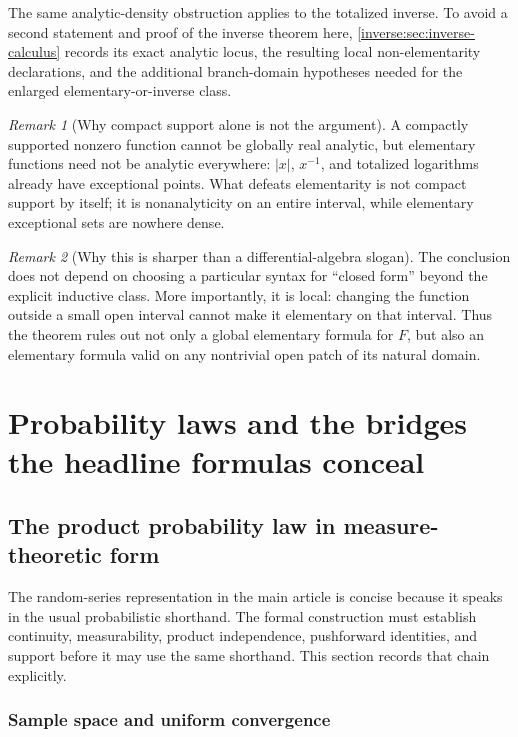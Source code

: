 \documentclass[11pt,oneside]{article}
\theoremstyle{definition}
\theoremstyle{remark}
\newtheorem{remark}[remark]{Remark}
\begin{document}
The same analytic-density obstruction applies to the totalized inverse.  To avoid a second
statement and proof of the inverse theorem here, \cref{inverse:sec:inverse-calculus} records
its exact analytic locus, the resulting local non-elementarity declarations, and the
additional branch-domain hypotheses needed for the enlarged elementary-or-inverse class.

\begin{remark}[Why compact support alone is not the argument]
A compactly supported nonzero function cannot be globally real analytic, but elementary
functions need not be analytic everywhere: $|x|$, $x^{-1}$, and totalized logarithms already
have exceptional points.  What defeats elementarity is not compact support by itself; it is
nonanalyticity on an entire interval, while elementary exceptional sets are nowhere dense.
\end{remark}

\begin{remark}[Why this is sharper than a differential-algebra slogan]
The conclusion does not depend on choosing a particular syntax for ``closed form'' beyond
the explicit inductive class.  More importantly, it is local: changing the function outside
a small open interval cannot make it elementary on that interval.  Thus the theorem rules
out not only a global elementary formula for $F$, but also an elementary formula valid on
any nontrivial open patch of its natural domain.
\end{remark}

\section{Probability laws and the bridges the headline formulas conceal}

\subsection{The product probability law in measure-theoretic form}
\label{integration:sec:product-law}

The random-series representation in the main article is concise because it speaks in the
usual probabilistic shorthand.  The formal construction must establish continuity,
measurability, product independence, pushforward identities, and support before it may use
the same shorthand.  This section records that chain explicitly.

\subsubsection{Sample space and uniform convergence}
\end{document}
